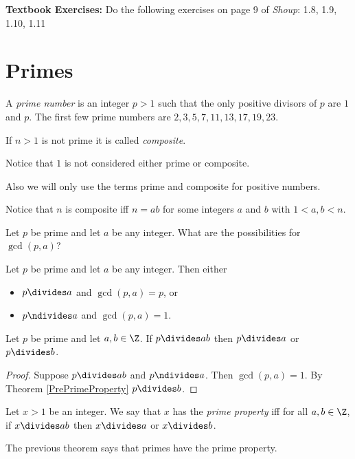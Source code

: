 \documentclass[oneside,12pt]{amsart}
\begin{document}
\bigskip

\textbf{Textbook Exercises:} Do the following exercises on page 9 of
\emph{Shoup}: 1.8, 1.9, 1.10, 1.11

\newpage

\section{Primes}

A \emph{prime number} is an integer $p>1$ such that the only positive divisors
of $p$ are $1$ and $p$. The first few prime numbers are $2,3,5,7,11,13,17,19,23$.

If $n>1$ is not prime it is called \emph{composite}.

Notice that $1$ is not considered either prime or composite.

Also we will only use the terms prime and composite for positive numbers.

Notice that $n$ is composite iff  $n=ab$ for some integers $a$ and $b$ with
$1<a,b<n$.

Let $p$ be prime and let $a$ be any integer. What are the possibilities
for $\gcd(p,a)$?

\begin{homework}
Let $p$ be prime and let $a$ be any integer. Then either
\begin{itemize}
  \item $p\divides a$ and $\gcd(p,a) = p$, or
  \item $p\ndivides a$ and $\gcd(p,a) = 1$.
\end{itemize}
\end{homework}

\begin{theorem} Let $p$ be prime and let $a,b\in\Z$.
\label{PrimeProperty}
If $p\divides ab$ then $p\divides a$ or $p\divides b$.
\end{theorem}
\begin{proof}
Suppose $p\divides ab$ and $p\ndivides a$. Then $\gcd(p,a) = 1$.
By Theorem \ref{PrePrimeProperty} $p\divides b$.
\end{proof}

\begin{definition}
\label{PrimePropertyDef}
Let $x>1$ be an integer. We say that $x$ has the \emph{prime property}
iff for all $a,b\in\Z$, if $x\divides ab$ then $x\divides a$ or $x\divides b$.
\end{definition}

The previous theorem says that primes have the prime property.
\end{document}
